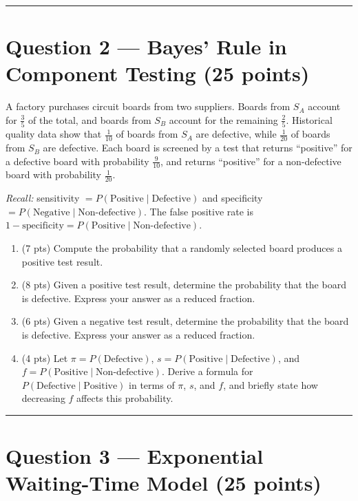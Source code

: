 \documentclass[11pt]{article}
\begin{document}
\vspace{0.75em}
\hrule
\vspace{0.75em}

\section*{Question 2 — Bayes' Rule in Component Testing (25 points)}

A factory purchases circuit boards from two suppliers. Boards from $S_A$ account for $\tfrac{3}{5}$ of the total, and boards from $S_B$ account for the remaining $\tfrac{2}{5}$. Historical quality data show that $\tfrac{1}{10}$ of boards from $S_A$ are defective, while $\tfrac{1}{20}$ of boards from $S_B$ are defective. Each board is screened by a test that returns ``positive'' for a defective board with probability $\tfrac{9}{10}$, and returns ``positive'' for a non-defective board with probability $\tfrac{1}{20}$.

\medskip
\noindent\textit{Recall:} sensitivity $= P(\text{Positive} \mid \text{Defective})$ and specificity $= P(\text{Negative} \mid \text{Non-defective})$. The false positive rate is $1-\text{specificity} = P(\text{Positive} \mid \text{Non-defective})$.

\begin{enumerate}
  \item (7 pts) Compute the probability that a randomly selected board produces a positive test result.
  \item (8 pts) Given a positive test result, determine the probability that the board is defective. Express your answer as a reduced fraction.
  \item (6 pts) Given a negative test result, determine the probability that the board is defective. Express your answer as a reduced fraction.
  \item (4 pts) Let $\pi = P(\text{Defective})$, $s = P(\text{Positive} \mid \text{Defective})$, and $f = P(\text{Positive} \mid \text{Non-defective})$. Derive a formula for $P(\text{Defective} \mid \text{Positive})$ in terms of $\pi$, $s$, and $f$, and briefly state how decreasing $f$ affects this probability.
\end{enumerate}

\vspace{0.75em}
\hrule
\vspace{0.75em}

\section*{Question 3 — Exponential Waiting-Time Model (25 points)}
\end{document}

